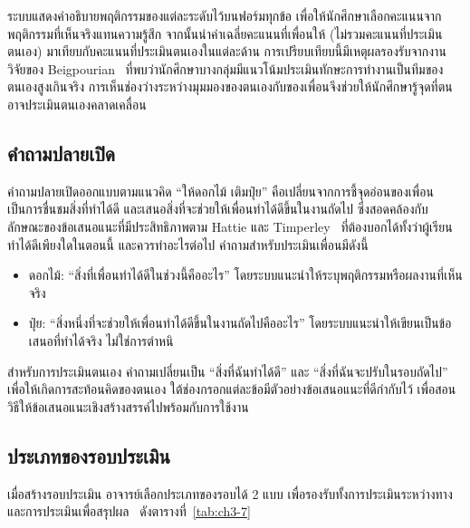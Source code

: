 ระบบแสดงคำอธิบายพฤติกรรมของแต่ละระดับไว้บนฟอร์มทุกข้อ เพื่อให้นักศึกษาเลือกคะแนนจากพฤติกรรมที่เห็นจริงแทนความรู้สึก จากนั้นนำค่าเฉลี่ยคะแนนที่เพื่อนให้ (ไม่รวมคะแนนที่ประเมินตนเอง) มาเทียบกับคะแนนที่ประเมินตนเองในแต่ละด้าน การเปรียบเทียบนี้มีเหตุผลรองรับจากงานวิจัยของ Beigpourian~\cite{beigpourian2020team} ที่พบว่านักศึกษาบางกลุ่มมีแนวโน้มประเมินทักษะการทำงานเป็นทีมของตนเองสูงเกินจริง การเห็นช่องว่างระหว่างมุมมองของตนเองกับของเพื่อนจึงช่วยให้นักศึกษารู้จุดที่ตนอาจประเมินตนเองคลาดเคลื่อน

\subsection{คำถามปลายเปิด}\label{sec:3.4.2}

คำถามปลายเปิดออกแบบตามแนวคิด ``ให้ดอกไม้ เติมปุ๋ย'' คือเปลี่ยนจากการชี้จุดอ่อนของเพื่อน เป็นการชื่นชมสิ่งที่ทำได้ดี และเสนอสิ่งที่จะช่วยให้เพื่อนทำได้ดีขึ้นในงานถัดไป ซึ่งสอดคล้องกับลักษณะของข้อเสนอแนะที่มีประสิทธิภาพตาม Hattie และ Timperley~\cite{hattie2007feedback} ที่ต้องบอกได้ทั้งว่าผู้เรียนทำได้ดีเพียงใดในตอนนี้ และควรทำอะไรต่อไป คำถามสำหรับประเมินเพื่อนมีดังนี้

\begin{itemize}
  \item ดอกไม้: ``สิ่งที่เพื่อนทำได้ดีในช่วงนี้คืออะไร'' โดยระบบแนะนำให้ระบุพฤติกรรมหรือผลงานที่เห็นจริง
  \item ปุ๋ย: ``สิ่งหนึ่งที่จะช่วยให้เพื่อนทำได้ดีขึ้นในงานถัดไปคืออะไร'' โดยระบบแนะนำให้เขียนเป็นข้อเสนอที่ทำได้จริง ไม่ใช่การตำหนิ
\end{itemize}

สำหรับการประเมินตนเอง คำถามเปลี่ยนเป็น ``สิ่งที่ฉันทำได้ดี'' และ ``สิ่งที่ฉันจะปรับในรอบถัดไป'' เพื่อให้เกิดการสะท้อนคิดของตนเอง ใต้ช่องกรอกแต่ละข้อมีตัวอย่างข้อเสนอแนะที่ดีกำกับไว้ เพื่อสอนวิธีให้ข้อเสนอแนะเชิงสร้างสรรค์ไปพร้อมกับการใช้งาน

\subsection{ประเภทของรอบประเมิน}\label{sec:3.4.3}

เมื่อสร้างรอบประเมิน อาจารย์เลือกประเภทของรอบได้ 2 แบบ เพื่อรองรับทั้งการประเมินระหว่างทางและการประเมินเพื่อสรุปผล~\cite{black1998assessment} ดังตารางที่~\ref{tab:ch3-7}

